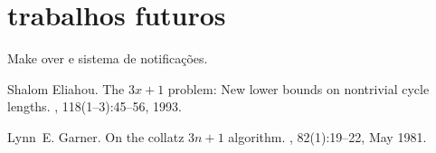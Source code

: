 \documentclass[11pt,twoside,a4paper]{report}
\begin{document}
\section{trabalhos futuros}
Make over e sistema de notificações.

%
%
\cleardoublepage
\iffalse
  
\else
  \begin{thebibliography}{10}

  Shalom Eliahou.
  \newblock The $3x+1$ problem: New lower bounds on nontrivial cycle lengths.
  , 118(1--3):45--56, 1993.

  Lynn~E. Garner.
  \newblock On the collatz $3n+1$ algorithm.
  , 82(1):19--22,
    May 1981.
  \end{thebibliography}
\fi
\cleardoublepage
\end{document}
